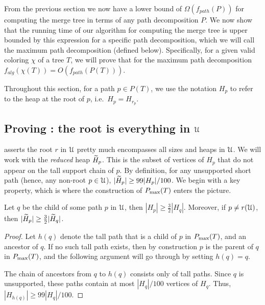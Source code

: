 {{From the previous section we now have a lower bound of $\Omega(f_{path}(P))$ for computing the merge tree in terms of any path decomposition $P$. 
We now show that the running time of our algorithm for computing the merge tree is upper bounded by this expression for a specific path decomposition, 
which we will call the maximum path decomposition (defined below).
Specifically, for a given valid coloring $\chi$ of a tree $T$, we will prove that for the maximum path decomposition $f_{alg}(\chi(T)) = O(f_{path}(P(T)))$. 

Throughout this section, for a path $p\in P(T)$, we use the notation $H_p$ to refer to the heap at the root of $p$, i.e.\ $H_p = H_{r_p}$.
}




\subsection{Proving : the root is everything in ${\cal U}$} \label{sec:weight}

 asserts the root $r$ in ${\cal U}$ pretty much encompasses all sizes and heaps in ${\cal U}$.
We will work with the \emph{reduced} heap $\widetilde{H}_p$. This is the subset of vertices of $H_p$ that 
do not appear on the tall support chain of $p$.
By definition, for any unsupported short path
(hence, any non-root $p \in {\cal U}$), $|\widetilde{H}_p| \geq 99|H_p|/100$. 
We begin with a key property, which is where the construction of $P_{\max}(T)$ enters the picture.


\begin{lemma}
\label{lem:geometric}
 Let $q$ be the child of some path $p$ in ${\cal U}$, then $|H_p|\geq \frac{3}{2}|H_q|$. 
 Moreover, if $p\neq r({\cal U})$, then $|\widetilde{H}_p|\geq \frac{3}{2}|\widetilde{H}_q|$. 
\end{lemma}
\begin{proof} Let $h(q)$ denote the tall path that is a child of $p$ in $P_{\max}(T)$,
and an ancestor of $q$. If no such tall path exists, then by construction $p$ is the parent 
of $q$ in $P_{\max}(T)$, and the following argument will go through by setting $h(q)=q$.

The chain of ancestors from $q$ to $h(q)$ consists only of tall paths.
Since $q$ is unsupported, these paths contain at most $|H_q|/100$ vertices of $H_q$. 
Thus, $|H_{h(q)}| \geq 99|H_q|/100$.


\end{proof}}
